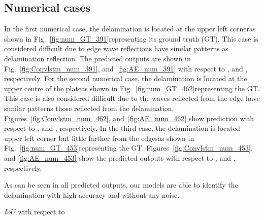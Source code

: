 \DIFaddend \subsection{Numerical cases}
In the first numerical case, the delamination is located at the upper left corner\DIFaddbegin \DIFadd{, }\DIFaddend as shown in Fig.~\ref{fig:num_GT_391}\DIFaddbegin \DIFadd{, }\DIFaddend representing its ground truth (GT).
This case is considered difficult due to edge wave reflections \DIFdelbegin {}\DIFdelend \DIFaddbegin {}\DIFaddend have similar patterns as delamination reflection.
The predicted outputs are shown in Fig.~\ref{fig:Convlstm_num_391}, and~\ref{fig:AE_num_391} with respect to \DIFdelbegin {}\DIFdelend \DIFaddbegin {}\DIFaddend {}, and , respectively.
For the second numerical case, the delamination is located at the upper centre of the plate\DIFaddbegin \DIFadd{, }\DIFaddend as shown in Fig.~\ref{fig:num_GT_462}\DIFaddbegin \DIFadd{, }\DIFaddend representing the GT.
This case is also considered difficult due to the waves reflected from the edge \DIFdelbegin {}\DIFdelend have similar patterns \DIFdelbegin {}\DIFdelend \DIFaddbegin {}\DIFaddend those reflected from the delamination.
Figures~\ref{fig:Convlstm_num_462}, and~\ref{fig:AE_num_462} show prediction with respect to \DIFdelbegin {}\DIFdelend \DIFaddbegin {}\DIFaddend {}, and , respectively.
In the third case, the delamination is located \DIFaddbegin {}\DIFaddend upper left corner but \DIFaddbegin {}\DIFaddend little farther from the edges\DIFaddbegin \DIFadd{, }\DIFaddend as shown in Fig.~\ref{fig:num_GT_453}\DIFaddbegin \DIFadd{, }\DIFaddend representing the GT. 
Figures~\ref{fig:Convlstm_num_453}, and \ref{fig:AE_num_453} show the predicted outputs with respect to \DIFdelbegin {}\DIFdelend \DIFaddbegin {}\DIFaddend {}, and , respectively.
\DIFdelbegin %

\DIFdelend As can be seen in all predicted outputs, our models are able to identify the delamination with high accuracy and without any noise.
\DIFdelbegin {}\DIFdelend \DIFaddbegin 

 \DIFaddend \(IoU\) \DIFaddbegin {}\DIFaddend with respect to \DIFdelbegin {}\DIFdelend \DIFaddbegin {}  

